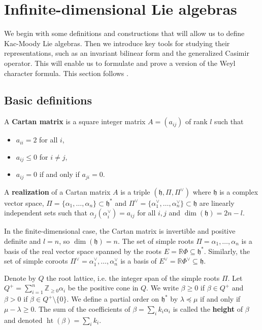 \documentclass[12pt]{article}
\begin{document}
\section{Infinite-dimensional Lie algebras}
We begin with some definitions and constructions that will allow us to define Kac-Moody Lie algebras. Then we introduce key tools for studying their representations, such as an invariant bilinear form and the generalized Casimir operator. This will enable us to formulate and prove a version of the Weyl character formula.
 This section follows \cite{kac}.
\subsection{Basic definitions}
\begin{definition}
    A \textbf{Cartan matrix} is a square integer matrix $A = (a_{ij})$ of rank $l$ such that
    \begin{itemize}
        \item $a_{ii} = 2$ for all $i$,
        \item $a_{ij} \leq 0$ for $i \neq j$,
        \item $a_{ij} = 0$ if and only if $a_{ji} = 0$.
    \end{itemize}
    A \textbf{realization} of a Cartan matrix $A$ is a triple $(\mathfrak{h}, \Pi, \Pi^\vee)$ where $\mathfrak{h}$ is a complex vector space, $\Pi = \{\alpha_1, \dots, \alpha_n\} \subset \mathfrak{h}^*$ and $\Pi^\vee = \{\alpha_1^\vee, \dots, \alpha_n^\vee\} \subset \mathfrak{h}$ are linearly independent sets such that $\alpha_j(\alpha_i^\vee) = a_{ij}$ for all $i,j$ and $\dim(\mathfrak{h}) = 2n - l$.
\end{definition}

\begin{remark}
    In the finite-dimensional case, the Cartan matrix is invertible and positive definite and $l = n$, so $\dim(\mathfrak{h}) = n$. The set of simple roots $\Pi = {\alpha_1, \dots, \alpha_n}$ is a basis of the real vector space spanned by the roots $E = \mathbb{R}\Phi \subseteq \mathfrak{h}^*$. Similarly, the set of simple coroots $\Pi^\vee = {\alpha_1^\vee, \dots, \alpha_n^\vee}$ is a basis of $E^\vee = \mathbb{R}\Phi^\vee \subseteq \mathfrak{h}$.
\end{remark}

Denote by $Q$ the root lattice, i.e. the integer span of the simple roots $\Pi$. Let $Q^+ = \sum_{i=1}^n \mathbb{Z}_{\geq 0} \alpha_i$ be the positive cone in $Q$. We write $\beta \geq 0$ if $\beta \in Q^+$ and $\beta > 0$ if $\beta \in Q^+ \setminus \{0\}$. We define a partial order on $\mathfrak{h}^*$ by $\lambda \preceq \mu$ if and only if $\mu - \lambda \geq 0$. The sum of the coefficients of $\beta = \sum_i k_i \alpha_i$ is called the \textbf{height} of $\beta$ and denoted $\operatorname{ht}(\beta) = \sum_i k_i$.
\end{document}
